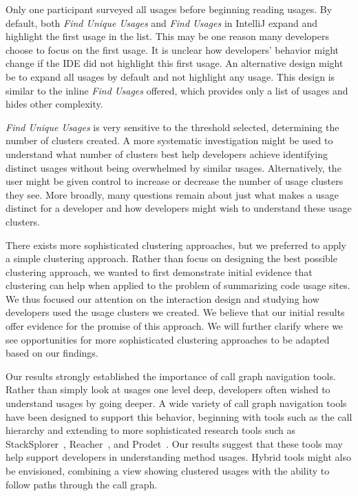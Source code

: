 \documentclass[conference]{IEEEtran}
\begin{document}
Only one participant surveyed all usages before beginning reading usages. By default, both \textit{Find Unique Usages} and \textit{Find Usages} in IntelliJ expand and highlight the first usage in the list. This may be one reason many developers choose to focus on the first usage. It is unclear how developers' behavior might change if the IDE did not highlight this first usage. An alternative design might be to expand all usages by default and not highlight any usage. 
This design is similar to the inline \textit{Find Usages} offered, which provides only a list of usages and hides other complexity. \par


\textit{Find Unique Usages} is very sensitive to the threshold selected, determining the number of clusters created. A more systematic investigation might be used to understand what number of clusters best help developers achieve identifying distinct usages without being overwhelmed by similar usages. Alternatively, the user might be given control to increase or decrease the number of usage clusters they see.
More broadly, many questions remain about just what makes a usage distinct for a developer and how developers might wish to understand these usage clusters.\par

There exists more sophisticated clustering approaches, but we preferred to apply a simple clustering approach. Rather than focus on designing the best possible clustering approach, we wanted to first demonstrate initial evidence that clustering can help when applied to the problem of summarizing code usage sites. We thus focused our attention on the interaction design and studying how developers used the usage clusters we created. We believe that our initial results offer evidence for the promise of this approach. We will further clarify where we see opportunities for more sophisticated clustering approaches to be adapted based on our findings.\par



Our results strongly established the importance of call graph navigation tools. Rather than simply look at usages one level deep, developers often wished to understand usages by going deeper. A wide variety of call graph navigation tools have been designed to support this behavior, beginning with tools such as the call hierarchy and extending to more sophisticated research tools such as StackSplorer~\cite{karrer2011stacksplorer}, Reacher~\cite{latoza2011visualizing}, and Prodet~\cite{augustine2015field}. Our results suggest that these tools may help support developers in understanding method usages. Hybrid tools might also be envisioned, combining a view showing clustered usages with the ability to follow paths through the call graph. 
\end{document}
